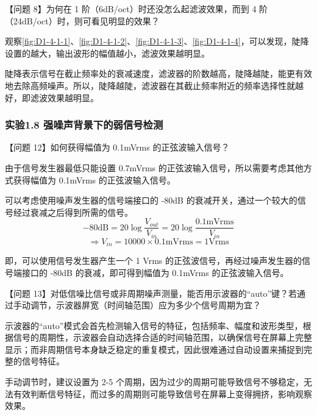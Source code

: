 \documentclass[dvipsnames, svgnames,a4paper,11pt]{article}
\begin{document}
		


		\vspace{0.05\textwidth} %



		【问题 8】为何在 1 阶（6dB/oct）时还没怎么起滤波效果，而到 4 阶（24dB/oct）时，则可看见明显的效果？

		观察\cref{fig:D1-4-1-1}、\cref{fig:D1-4-1-2}、\cref{fig:D1-4-1-3}、\cref{fig:D1-4-1-4}，可以发现，陡降设置的越大，输出波形的幅值越小，滤波效果越明显。

		陡降表示信号在截止频率处的衰减速度，滤波器的阶数越高，陡降越陡，能更有效地去除高频噪声。所以，陡降越陡，滤波器在其截止频率附近的频率选择性就越好，即滤波效果越明显。





	\subsubsection*{实验1.8 \quad 强噪声背景下的弱信号检测}

		【问题 12】如何获得幅值为 0.1mVrms 的正弦波输入信号？

		由于信号发生器最低只能设置 0.7mVrms 的正弦波输入信号，所以需要考虑其他方式获得幅值为 0.1mVrms 的正弦波输入信号。

		可以考虑使用噪声发生器的信号端接口的 -80dB 的衰减开关，通过一个较大的信号经过衰减之后得到所需的信号。
		\[
			- 80 \mathrm{dB} = 20 \log \frac{V_{out}}{V_{in}} = 20 \log \frac{0.1 \mathrm{mVrms}}{V_{in}}
		\]
		\[
			\Rightarrow V_{in} = 10000 \times 0.1 \mathrm{mVrms} = 1 \mathrm{Vrms}
		\]

		即，可以使用信号发生器产生一个 1 Vrms 的正弦波信号，再经过噪声发生器的信号端接口的 -80dB 的衰减，即可得到幅值为 0.1mVrms 的正弦波输入信号。


		\vspace{0.05\textwidth} %


		【问题 13】对低信噪比信号或非周期噪声测量，能否用示波器的“auto”键？若通过手动调节，示波器屏宽（时间轴范围）应为多少个信号周期为宜？

		示波器的“auto”模式会首先检测输入信号的特征，包括频率、幅度和波形类型，根据信号的周期性，示波器会自动选择合适的时间轴范围，以确保信号在屏幕上完整显示；而非周期信号本身缺乏稳定的重复模式，因此很难通过自动设置来捕捉到完整的信号特征。

		手动调节时，建议设置为 2-5 个周期，因为过少的周期可能导致信号不够稳定，无法有效判断信号特征，而过多的周期则可能导致信号在屏幕上变得拥挤，影响观察效果。
\end{document}
